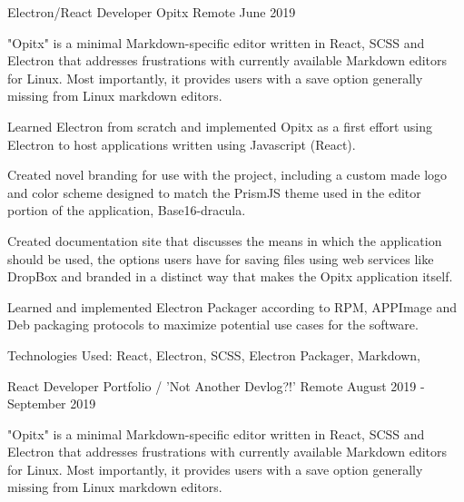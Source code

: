 

\begin{cventries}

  \cventry
    {Electron/React Developer} %
    {Opitx} %
    {Remote} %
    {June 2019} %
    {
      \begin{cvitems} %
        \item {"Opitx" is a minimal Markdown-specific editor written in React, SCSS and Electron that addresses frustrations with currently available Markdown editors for Linux. Most importantly, it provides users with a save option generally missing from Linux markdown editors.}
        \item {Learned Electron from scratch and implemented Opitx as a first effort using Electron to host applications written using Javascript (React).}
        \item {Created novel branding for use with the project, including a custom made logo and color scheme designed to match the PrismJS theme used in the editor portion of the application, Base16-dracula.}
        \item {Created documentation site that discusses the means in which the application should be used, the options users have for saving files using web services like DropBox and branded in a distinct way that makes the Opitx application itself.}
        \item {Learned and implemented Electron Packager according to RPM, APPImage and Deb packaging protocols to maximize potential use cases for the software.}
        \item {Technologies Used: React, Electron, SCSS, Electron Packager, Markdown, }
      \end{cvitems}
    }
  \cventry
    {React Developer} %
    {Portfolio / 'Not Another Devlog?!'} %
    {Remote} %
    {August 2019 - September 2019} %
    {
      \begin{cvitems} %
        \item {"Opitx" is a minimal Markdown-specific editor written in React, SCSS and Electron that addresses frustrations with currently available Markdown editors for Linux. Most importantly, it provides users with a save option generally missing from Linux markdown editors.}

\end{cvitems}}
\end{cventries}
